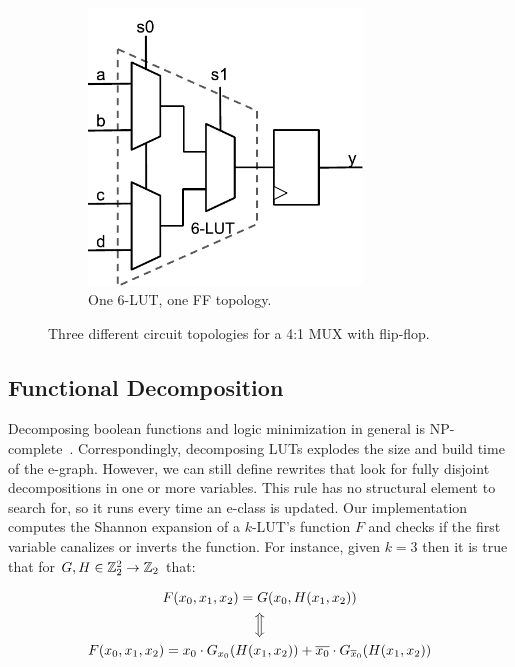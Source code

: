 \begin{figure}[tb]
\begin{subfigure}{0.38\textwidth}
    \end{subfigure}
    \begin{subfigure}{0.30\textwidth}
        \centering
        \includegraphics[width=0.80\textwidth]{img/mux_4_1_retime.pdf}
        \caption{One 6-LUT, one FF topology.}\label{fig:retiming:c}
    \end{subfigure}
    \caption{Three different circuit topologies for a 4:1 MUX with flip-flop.}\label{fig:retiming}
\end{figure}

\subsection{Functional Decomposition}\label{sec:rewrites:decomp}

Decomposing boolean functions and logic minimization in general is
NP-complete~\cite{logicmin}. Correspondingly, decomposing LUTs explodes the
size and build time of the e-graph. However, we can still define rewrites that
look for fully disjoint decompositions in one or more variables. This rule has
no structural element to search for, so it runs every time an e-class is
updated. Our implementation computes the Shannon expansion of a $k$-LUT's
function $F$ and checks if the first variable canalizes or inverts the
function. For instance, given $k=3$ then it is true that for $G, H \in \mathbb{Z}_{2}^2
    \rightarrow \mathbb{Z}_{2}$ that:

\begin{gather}
    F(x_0, x_1, x_2) = G(x_0, H(x_1, x_2)) \nonumber \\
    \Big\Updownarrow                       \nonumber \\
    F(x_0, x_1, x_2) = x_0 \cdot G_{x_0} (H(x_1, x_2)) +  \overline{x_0} \cdot G_{\overline{x}_0} (H(x_1, x_2))
\end{gather}

